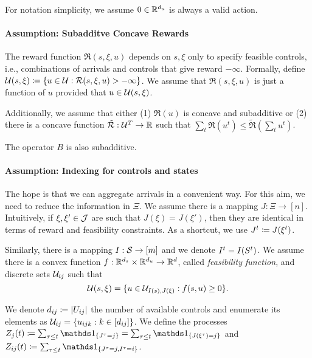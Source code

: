 \documentclass[letterpaper,11pt]{article}
\begin{document}
For notation simplicity, we assume $0\in \R^\du$ is always a valid action.

\paragraph{Assumption: Subadditve Concave Rewards}
The reward function $\Re(s,\xi,u)$ depends on $s,\xi$ only to specify feasible controls, i.e., combinations of arrivals and controls that give reward $-\infty$.
Formally, define $\U(s,\xi)\defeq \crl{u\in\U: \Re(s,\xi,u)>-\infty}$.
We assume that $\Re(s,\xi,u)$ is just a function of $u$ provided that $u\in\U(s,\xi)$.

Additionally, we assume that either (1) $\Re(u)$ is concave and subadditive or (2) there is a concave function $\tilde \Re:\U^\T\to\R$ such that $\sum_t\Re(u^t)\leq \tilde \Re(\sum_t u^t)$.

The operator $B$ is also subadditive.


\paragraph{Assumption: Indexing for controls and states}
The hope is that we can aggregate arrivals in a convenient way.
For this aim, we need to reduce the information in $\Xi$.
We assume there is a mapping $J:\Xi\to[n]$.
Intuitively, if $\xi,\xi'\in\J$ are such that $J(\xi)=J(\xi')$, then they are identical in terms of reward and feasibility constraints.
As a shortcut, we use $\Jt\defeq J(\xit)$.

Similarly, there is a mapping $I:\S\to [m]$ and we denote $\It=I(S^t)$.
We assume there is a convex function $f:\R^\ds\times\R^\du\to\R^d$, called \emph{feasibility function}, and discrete sets $\U_{ij}$ such that
\[
\U(s,\xi) = \crl{u\in \U_{I(s),J(\xi)}: f(s,u)\geq 0}.
\]

We denote $d_{ij}\defeq \abs{U_{ij}}$ the number of available controls and enumerate its elements as $\U_{ij} = \crl{u_{ijk}: k\in [d_{ij}]}$. 
We define the processes $Z_j(t)\defeq\sum_{\tau\leq t}\In{J^\tau=j}=\sum_{\tau\leq t}\In{J(\xi^\tau)=j}$ and $Z_{ij}(t) \defeq \sum_{\tau\leq t}\In{J^\tau=j,I^\tau=i}$.

\end{document}
